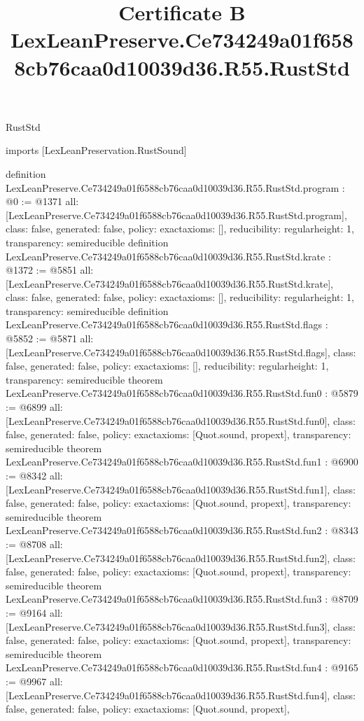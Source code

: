 \begin{lexlean}{RustStd}
\title{Certificate B LexLeanPreserve.Ce734249a01f6588cb76caa0d10039d36.R55.RustStd}
\begin{coremodule}
imports [LexLeanPreservation.RustSound]

definition LexLeanPreserve.Ce734249a01f6588cb76caa0d10039d36.R55.RustStd.program : @0 := @1371 {
  all: [LexLeanPreserve.Ce734249a01f6588cb76caa0d10039d36.R55.RustStd.program],
  class: false,
  generated: false,
  policy: exact{axioms: []},
  reducibility: regular{height: 1},
  transparency: semireducible
}
definition LexLeanPreserve.Ce734249a01f6588cb76caa0d10039d36.R55.RustStd.krate : @1372 := @5851 {
  all: [LexLeanPreserve.Ce734249a01f6588cb76caa0d10039d36.R55.RustStd.krate],
  class: false,
  generated: false,
  policy: exact{axioms: []},
  reducibility: regular{height: 1},
  transparency: semireducible
}
definition LexLeanPreserve.Ce734249a01f6588cb76caa0d10039d36.R55.RustStd.flags : @5852 := @5871 {
  all: [LexLeanPreserve.Ce734249a01f6588cb76caa0d10039d36.R55.RustStd.flags],
  class: false,
  generated: false,
  policy: exact{axioms: []},
  reducibility: regular{height: 1},
  transparency: semireducible
}
theorem LexLeanPreserve.Ce734249a01f6588cb76caa0d10039d36.R55.RustStd.fun0 : @5879 := @6899 {
  all: [LexLeanPreserve.Ce734249a01f6588cb76caa0d10039d36.R55.RustStd.fun0],
  class: false,
  generated: false,
  policy: exact{axioms: [Quot.sound, propext]},
  transparency: semireducible
}
theorem LexLeanPreserve.Ce734249a01f6588cb76caa0d10039d36.R55.RustStd.fun1 : @6900 := @8342 {
  all: [LexLeanPreserve.Ce734249a01f6588cb76caa0d10039d36.R55.RustStd.fun1],
  class: false,
  generated: false,
  policy: exact{axioms: [Quot.sound, propext]},
  transparency: semireducible
}
theorem LexLeanPreserve.Ce734249a01f6588cb76caa0d10039d36.R55.RustStd.fun2 : @8343 := @8708 {
  all: [LexLeanPreserve.Ce734249a01f6588cb76caa0d10039d36.R55.RustStd.fun2],
  class: false,
  generated: false,
  policy: exact{axioms: [Quot.sound, propext]},
  transparency: semireducible
}
theorem LexLeanPreserve.Ce734249a01f6588cb76caa0d10039d36.R55.RustStd.fun3 : @8709 := @9164 {
  all: [LexLeanPreserve.Ce734249a01f6588cb76caa0d10039d36.R55.RustStd.fun3],
  class: false,
  generated: false,
  policy: exact{axioms: [Quot.sound, propext]},
  transparency: semireducible
}
theorem LexLeanPreserve.Ce734249a01f6588cb76caa0d10039d36.R55.RustStd.fun4 : @9165 := @9967 {
  all: [LexLeanPreserve.Ce734249a01f6588cb76caa0d10039d36.R55.RustStd.fun4],
  class: false,
  generated: false,
  policy: exact{axioms: [Quot.sound, propext]},
}
\end{coremodule}
\end{lexlean}
